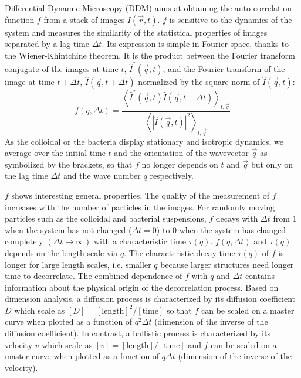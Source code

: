 \documentclass[prb,twocolumn,amsmath,amssymb]{revtex4-1}
\newcommand{\tgn}[1]{{\color{blue}#1}} %
\begin{document}
\tgn{Differential Dynamic Microscopy (DDM) aims at obtaining the auto-correlation function $f$\cite{ajp1995passmore} from a stack of images $I(\vec{r}, t)$. $f$ is sensitive to the dynamics of the system and measures the similarity of the statistical properties of images separated by a lag time $\Delta t$. Its expression is simple in Fourier space,  thanks to the Wiener-Khintchine theorem. It is the product between the Fourier transform conjugate of the images at time $t$,  $\hat{I}^*(\vec{q}, t)$, and the Fourier transform of the image at time $t+\Delta t$, $\hat{I}(\vec{q}, t+\Delta t)$ normalized by the square norm of $\hat{I}(\vec{q}, t)$:
\begin{equation}
f(q, \Delta t) =\frac{\left\langle \hat{I}^*(\vec{q}, t) \hat{I}(\vec{q}, t+\Delta t) \right\rangle_{t, \vec{q}}}{\left\langle | \widehat{I}(\vec{q},t)|^2  \right\rangle_{t, \vec{q}} }
\label{eq:f}
\end{equation}
As the colloidal or the bacteria display stationary and  isotropic dynamics, we average over the initial time $t$ and the orientation of the wavevector $\vec{q}$ as symbolized by the brackets, so that $f$ no longer depends on $t$ and $\vec{q}$  but only on the lag time $\Delta t$ and the wave number $q$ respectively. 

$f$ shows interesting general properties. The quality of the measurement of $f$ increases with the number of particles in the images. For randomly moving particles such as the colloidal and bacterial suspensions, $f$ decays with $\Delta t$ from 1 when the system has not changed ($\Delta t=0$) to 0 when the system has changed completely $(\Delta t\rightarrow\infty)$ with a characteristic time $\tau(q)$. $f(q, \Delta t)$ and $\tau(q)$ depends on the length scale via  $q$. The characteristic decay time \tgn{$\tau(q)$} of $f$ is longer for large length scales, i.e. smaller $q$ because larger structures need longer time to decorrelate. The combined dependence of $f$ with $q$ and $\Delta t$ contains information about the physical origin of the decorrelation process. Based on dimension analysis, a diffusion process is characterized by its diffusion coefficient $D$ which scale as $[D]=[\text{length}]^2/[\text{time}]$ so that $f$ can be scaled on a master curve when plotted as a function of $q^2\Delta t$ (dimension of the inverse of the diffusion coefficient). In contrast, a ballistic process is characterized by its velocity $v$ which scale as $[v]=[\text{length}]/[\text{time}]$ and  $f$ can be scaled on a master curve when plotted as a function of $q\Delta t$ (dimension of the inverse of the velocity).

}
\end{document}
